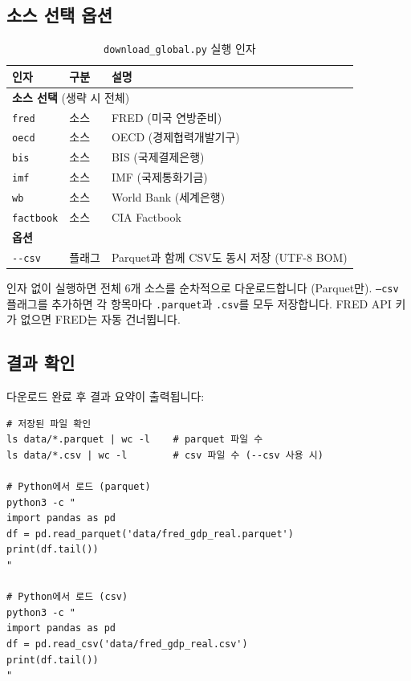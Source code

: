 \documentclass[11pt,a4paper]{article}
\newcommand{\code}[1]{\texttt{#1}}
\newcommand{\file}[1]{\texttt{\textcolor{string}{#1}}}
\begin{document}
\subsection{소스 선택 옵션}

\begin{table}[h]
\centering
\caption{\code{download\_global.py} 실행 인자}
\begin{tabular}{l l l}
\toprule
\textbf{인자} & \textbf{구분} & \textbf{설명} \\
\midrule
\multicolumn{3}{l}{\textbf{소스 선택} (생략 시 전체)} \\
\midrule
\code{fred}     & 소스 & FRED (미국 연방준비) \\
\code{oecd}     & 소스 & OECD (경제협력개발기구) \\
\code{bis}      & 소스 & BIS (국제결제은행) \\
\code{imf}      & 소스 & IMF (국제통화기금) \\
\code{wb}       & 소스 & World Bank (세계은행) \\
\code{factbook} & 소스 & CIA Factbook \\
\midrule
\multicolumn{3}{l}{\textbf{옵션}} \\
\midrule
\code{-{}-csv}  & 플래그 & Parquet과 함께 CSV도 동시 저장 (UTF-8 BOM) \\
\bottomrule
\end{tabular}
\end{table}

인자 없이 실행하면 전체 6개 소스를 순차적으로 다운로드합니다 (Parquet만).
\code{--csv} 플래그를 추가하면 각 항목마다 \file{.parquet}과 \file{.csv}를 모두 저장합니다.
FRED API 키가 없으면 FRED는 자동 건너뜁니다.

\subsection{결과 확인}

다운로드 완료 후 결과 요약이 출력됩니다:

\begin{lstlisting}[style=bash]
# 저장된 파일 확인
ls data/*.parquet | wc -l    # parquet 파일 수
ls data/*.csv | wc -l        # csv 파일 수 (--csv 사용 시)

# Python에서 로드 (parquet)
python3 -c "
import pandas as pd
df = pd.read_parquet('data/fred_gdp_real.parquet')
print(df.tail())
"

# Python에서 로드 (csv)
python3 -c "
import pandas as pd
df = pd.read_csv('data/fred_gdp_real.csv')
print(df.tail())
"
\end{lstlisting}
\end{document}
